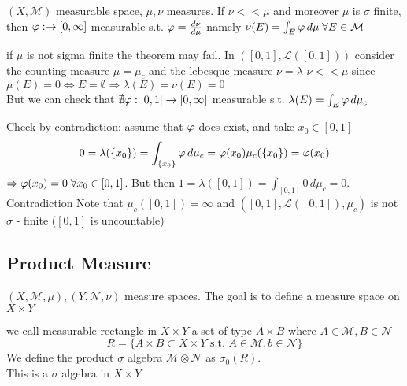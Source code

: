 \begin{theorem}
    \(\left(X, \mathcal{M}\right) \) measurable space, \(\mu, \nu\) measures. If \(\nu << \mu \) and moreover \(\mu \) is \(\sigma\) finite, then \(\oldphi : \to \left[0, \infty\right]\) measurable s.t.
    \(\oldphi = \frac{d \nu}{d \mu}\) namely \(\nu(E)= \int_E \oldphi \, d\mu \; \forall E \in \mathcal{M}\)
\end{theorem}

\begin{remark}
    if \(\mu\) is not sigma finite the theorem may fail.
    In \(\left(\left[0, 1\right], \mathcal{L}\left(\left[0, 1\right]\right)\right)\) consider the counting measure \(\mu = \mu_c\) and the lebesque measure \(\nu= \lambda\)
    \(\nu << \mu\) since \(\mu(E)= 0 \iff E= \emptyset \Rightarrow \lambda(E) = \nu(E)=0\) \\
    But we can check that \( \nexists \oldphi : \left[0, 1\right] \rightarrow \left[0, \infty \right]\) measurable s.t. \(\lambda(E)= \int_E \oldphi \, d\mu_c\)
\end{remark}

Check by contradiction: assume that \(\oldphi \) does exist, and take \(x_0 \in \left[0, 1\right]\)
\[ 0 = \lambda (\left\{x_0\right\}) = \int_{\left\{x_0\right\}} \oldphi \, d\mu_c = \oldphi (x_0) \mu_c (\left\{x_0\right\}) = \oldphi (x_0)\]
\(\Rightarrow \oldphi (x_0) = 0 \; \forall x_0 \in \left[0, 1\right]\). But then \(1 = \lambda(\left[0, 1\right]) = \int_{\left[0, 1\right]} 0 \, d\mu_c = 0\). Contradiction
Note that \(\mu_c (\left[0, 1\right]) = \infty \) and \(\left( \left[0,1\right], \mathcal{L}(\left[0, 1\right]), \mu_c\right)\) is not \(\sigma\) - finite (\(\left[0,1\right]\) is uncountable)


\subsection*{Product Measure}
\( (X, \mathcal{M}, \mu), (Y, \mathcal{N}, \nu) \) measure spaces.
The goal is to define a measure space on \(X \times Y\)
\begin{definition}
    we call measurable rectangle in \(X \times Y\) a set of type \(A \times B\) where \(A \in \mathcal{M}, B \in \mathcal{N}\)
    \[  R = \{ A \times B \subset X\times Y \text{ s.t. } A \in \mathcal{M}, b \in \mathcal{N}\}\]
    We define the product \(\sigma\) algebra \(\mathcal{M} \otimes \mathcal{N}\) as \(\sigma_0(R)\). \\
    This is a \(\sigma\) algebra in \(X \times Y\)
\end{definition}

